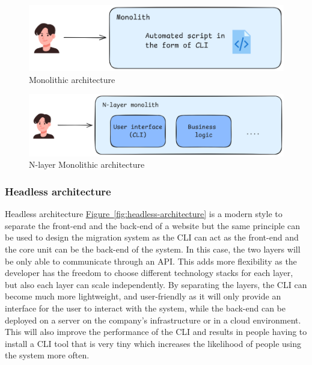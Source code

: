 \documentclass{article}
\newcommand{\FigRef}[1]{\hyperref[#1]{Figure~\ref{#1}}}
\begin{document}
\begin{multicols}{2}
\begin{figure}[H]
    \centering
    \includegraphics[width=\linewidth]{images/monolithic-architecture.png}
    \caption{Monolithic architecture}
    \label{fig:monolithic-architecture}
\end{figure}

\begin{figure}[H]
    \centering
    \includegraphics[width=\linewidth]{images/n-layer-architecture.png}
    \caption{N-layer Monolithic architecture}
    \label{fig:n-layer-monolithic-architecture}
\end{figure}

\subsubsection{Headless architecture}
Headless architecture \FigRef{fig:headless-architecture} is a modern style to separate the front-end and the back-end of a website but the same principle can be used to design the migration system as the CLI can act as the front-end and the core unit can be the back-end of the system. In this case, the two layers will be only able to communicate through an API. This adds more flexibility as the developer has the freedom to choose different technology stacks for each layer, but also each layer can scale independently. By separating the layers, the CLI can become much more lightweight, and user-friendly as it will only provide an interface for the user to interact with the system, while the back-end can be deployed on a server on the company's infrastructure or in a cloud environment. This will also improve the performance of the CLI and results in people having to install a CLI tool that is very tiny which increases the likelihood of people using the system more often.


\end{multicols}
\end{document}
